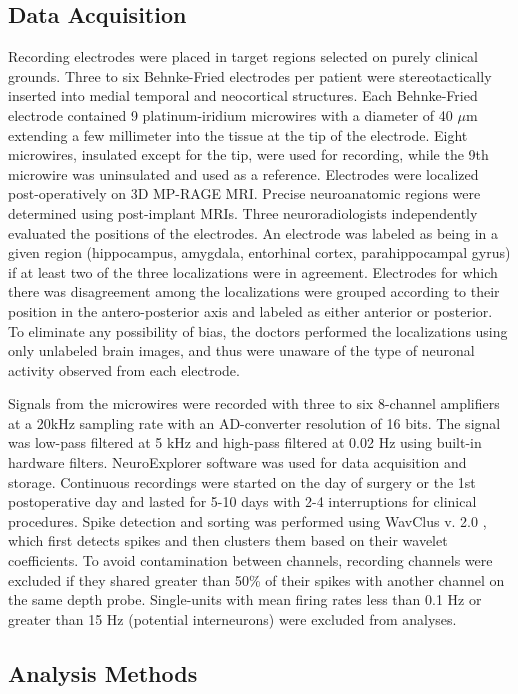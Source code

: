 \subsection*{Data Acquisition}
Recording electrodes were placed in target regions selected on purely clinical grounds. Three to six Behnke-Fried electrodes per patient were stereotactically inserted into medial temporal and neocortical structures. Each Behnke-Fried electrode contained 9 platinum-iridium microwires with a diameter of 40 $\mu$m extending a few millimeter into the tissue at the tip of the electrode. Eight microwires, insulated except for the tip, were used for recording, while the 9th microwire was uninsulated and used as a reference. Electrodes were localized post-operatively on 3D MP-RAGE MRI. Precise neuroanatomic regions were determined using post-implant MRIs. Three neuroradiologists independently evaluated the positions of the electrodes. An electrode was labeled as being in a given region (hippocampus, amygdala, entorhinal cortex, parahippocampal gyrus) if at least two of the three localizations were in agreement. Electrodes for which there was disagreement among the localizations were grouped according to their position in the antero-posterior axis and labeled as either anterior or posterior. To eliminate any possibility of bias, the doctors performed the localizations using only unlabeled brain images, and thus were unaware of the type of neuronal activity observed from each electrode.


Signals from the microwires were recorded with three to six 8-channel amplifiers at a 20kHz sampling rate  with an AD-converter resolution of 16 bits. The signal was low-pass filtered at 5 kHz and high-pass filtered at 0.02 Hz using built-in hardware filters. NeuroExplorer software was used for data acquisition and storage.  Continuous recordings were started on the day of surgery or the 1st postoperative day and lasted for 5-10 days with 2-4 interruptions for clinical procedures. Spike detection and sorting was performed using WavClus v. 2.0 \cite{QuirEtal04}, which first detects spikes and then clusters them based on their wavelet coefficients. To avoid contamination between channels, recording channels were excluded if they shared greater than 50\% of their spikes with another channel on the same depth probe.  Single-units with mean firing rates less than 0.1 Hz or greater than 15 Hz (potential interneurons) were excluded from analyses.

\subsection*{Analysis Methods}

